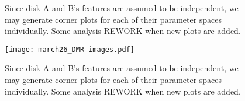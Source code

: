 
\begin{figure}[htp]
  \hspace*{\fill}%
   \hfill%
  \hspace*{\fill}%
  \caption{Since disk A and B's features are assumed to be independent, we may generate corner plots for each of their parameter spaces individually. Some analysis REWORK when new plots are added.}
  \label{fig:co_corner_plots}
\end{figure}


\begin{figure}[htp]
  \hspace*{\fill}%
  \texttt{[image: march26\_DMR-images.pdf]}\hfill%
  \hspace*{\fill}%
  \caption{Since disk A and B's features are assumed to be independent, we may generate corner plots for each of their parameter spaces individually. Some analysis REWORK when new plots are added.}
  \label{fig:co_chanmaps}
\end{figure}





